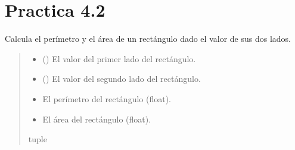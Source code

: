 \documentclass[letterpaper,10pt,spanish]{sphinxmanual}
\begin{document}
\section{Practica 4.2}
\label{\detokenize{pr4:module-pr4.2}}\label{\detokenize{pr4:practica-4-2}}

\begin{fulllineitems}
\label{\detokenize{pr4:pr4.2.calcular_perimetro_area_rectangulo}}
\pysigstartsignatures
{}
\pysigstopsignatures
\sphinxAtStartPar
Calcula el perímetro y el área de un rectángulo dado el valor de sus dos lados.
\begin{quote}\begin{description}
\begin{itemize}
\item {} 
\sphinxAtStartPar
{} () \textendash{} El valor del primer lado del rectángulo.

\item {} 
\sphinxAtStartPar
{} () \textendash{} El valor del segundo lado del rectángulo.

\end{itemize}

\sphinxAtStartPar
\begin{description}
\begin{itemize}
\item {} 
\sphinxAtStartPar
El perímetro del rectángulo (float).

\item {} 
\sphinxAtStartPar
El área del rectángulo (float).

\end{itemize}

\end{description}


\sphinxAtStartPar
tuple

\end{description}\end{quote}

\end{fulllineitems}
\end{document}
